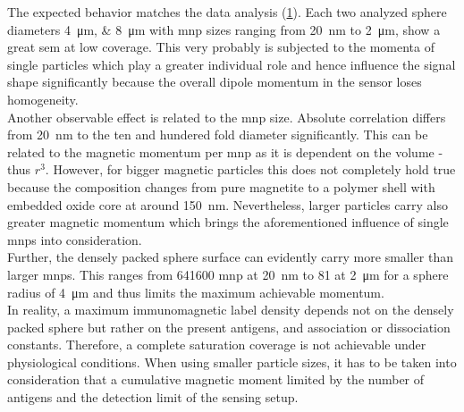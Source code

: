 The expected behavior matches the data analysis (\cref{fig:sim:coverage}). Each two analyzed sphere diameters \SIlist{4;8}{\micro\meter} with \gls{mnp} sizes ranging from \SI{20}{\nano\meter} to \SI{2}{\micro\meter}, show a great \gls{sem} at low coverage. This very probably is subjected to the momenta of single particles which play a greater individual role and hence influence the signal shape significantly because the overall dipole momentum in the sensor loses homogeneity. \\
Another observable effect is related to the \gls{mnp} size. Absolute correlation differs from \SI{20}{\nano\meter} to the ten and hundered fold diameter significantly. This can be related to the magnetic momentum per \gls{mnp} as it is dependent on the volume - thus $r^3$. However, for bigger magnetic particles this does not completely hold true because the composition changes from pure magnetite to a polymer shell with embedded oxide core at around \SI{150}{\nano\meter}. Nevertheless, larger particles carry also greater magnetic momentum which brings the aforementioned influence of single \glspl{mnp} into consideration. \\ 
Further, the densely packed sphere surface can evidently carry more smaller than larger \glspl{mnp}. This ranges from \num{641600} \gls{mnp} at \SI{20}{\nano\meter} to \num{81} at \SI{2}{\micro\meter} for a sphere radius of \SI{4}{\micro\meter} and thus limits the maximum achievable momentum. \\
In reality, a maximum immunomagnetic label density depends not on the densely packed sphere but rather on the present antigens, and association or dissociation constants. Therefore, a complete saturation coverage is not achievable under physiological conditions. When using smaller particle sizes, it has to be taken into consideration that a cumulative magnetic moment limited by the number of antigens and the detection limit of the sensing setup.

\begin{figure}
	\centering
	 \hfill
	\addtocounter{subfigure}{-1}
	 \\
	\vspace{\baselineskip}	
	\addtocounter{subfigure}{-1}
	\hfill
	\addtocounter{subfigure}{-1}
\label{fig:sim:coverage}
\end{figure}

